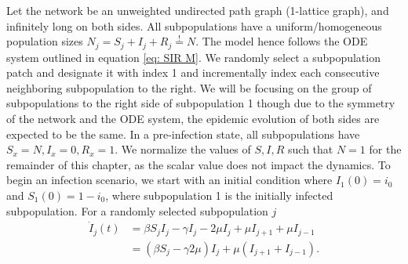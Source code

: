 \begin{center}
\end{center}

Let the network be an unweighted undirected path graph (1-lattice graph), and infinitely long on both sides. All subpopulations have a uniform/homogeneous population sizes $N_j=S_j+I_j+R_j\stackrel{!}{=}N$. The model hence follows the ODE system outlined in equation \ref{eq: SIR M}. We randomly select a subpopulation patch and designate it with index 1 and incrementally index each consecutive neighboring subpopulation to the right. We will be focusing on the group of subpopulations to the right side of subpopulation 1 though due to the symmetry of the network and the ODE system, the epidemic evolution of both sides are expected to be the same. In a pre-infection state, all subpopulations have $S_x=N,I_x=0,R_x=1$. We normalize the values of $S,I,R$ such that $N=1$ for the remainder of this chapter, as the scalar value does not impact the dynamics. To begin an infection scenario, we start with an initial condition where $I_1(0)=i_0$ and $S_1(0)=1-i_0$, where subpopulation 1 is the initially infected subpopulation.
For a randomly selected subpopulation $j$
\begin{equation}
    \begin{aligned}
    \dot I_j(t) &= \beta S_j I_j - \gamma I_j - 2\mu I_j  + \mu I_{j+1}+ \mu I_{j-1} \\
    &= (\beta S_j - \gamma 2 \mu) I_j + \mu (I_{j+1}+ I_{j-1}).
\end{aligned}
\label{eq:I_j}
\end{equation}

